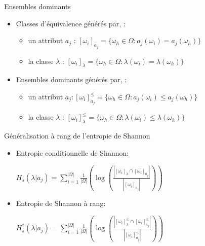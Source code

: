 \documentclass{beamer}
\begin{document}
\begin{frame}{Ensembles dominants}
\begin{itemize}
\item Classes d'équivalence générés par, : 
\begin{itemize}
\item un attribut $a_j$ : $[\omega_i]_{a_j} = \{\omega_h \in \Omega : a_j(\omega_i) = a_j(\omega_h)\}$
\item la classe $\lambda$ : $[\omega_i]_{\lambda} = \{\omega_h \in \Omega : \lambda(\omega_i) = \lambda(\omega_h)\}$
\end{itemize}

\item Ensembles dominants générés par, :
\begin{itemize}
\item un attribut $a_j : [\omega_i]^{\leq}_{a_j} = \{\omega_h \in \Omega : a_j(\omega_i) \leq a_j(\omega_h)\}$
\item la classe $\lambda$ : $[\omega_i]^{\leq}_{\lambda} = \{\omega_h \in \Omega : \lambda(\omega_i) \leq \lambda(\omega_h)\}$
\end{itemize}

\end{itemize}
\end{frame}

\begin{frame}{Généralisation à rang de l'entropie de Shannon}
\begin{itemize}
\item Entropie conditionnelle de Shannon: 

$H_s(\lambda | a_j) = \sum_{i=1}^{|\Omega|} \frac{1}{|\Omega|}(\log (\frac{|[\omega_i]_{\lambda} \cap [\omega_i]_{a_j}|}{|[\omega_i]_{a_j}|}))$

\item Entropie de Shannon à rang: 

$H^*_s(\lambda | a_j) = \sum_{i=1}^{|\Omega|} \frac{1}{|\Omega|}(\log (\frac{|[\omega_i]^{\leq}_{\lambda} \cap [\omega_i]^{\leq}_{a_j}|}{|[\omega_i]^{\leq}_{a_j}|}))$

\end{itemize}

\end{frame}
\end{document}
